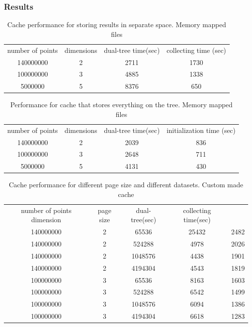 \documentclass[12pt,letterpaper,doublespaced,ETD,dvips,proposal]{gtthesis}
\begin{document}
\begin{Body}
\subsubsection{Results}
\begin{table}[!htb]
\footnotesize{ \centering
\begin{tabular}{|c|c|c|c|}
  \hline
  number of points & dimensions & dual-tree time(sec)& collecting time (sec)\\ 
  140000000        & 2          & 2711               & 1730\\
  100000000        & 3          & 4885               & 1338\\
  5000000          & 5          & 8376               & 650\\
  \hline
\end{tabular}
\caption{Cache performance for storing results in separate space. Memory mapped files}
}
\end{table}

\begin{table}[!htb]
\footnotesize{ \centering
\begin{tabular}{|c|c|c|c|}
  \hline
  number of points & dimensions & dual-tree time(sec)& initialization time (sec)\\ 
  140000000 & 2 & 2039 & 836\\
  100000000 & 3 & 2648 & 711\\
  5000000   & 5 & 4131 & 430\\
  \hline
\end{tabular}
\caption{Performance for cache that stores everything on the tree. Memory mapped files}
}
\end{table}

\begin{table}[!htb]
\footnotesize{ \centering
\begin{tabular}{|c|c|c|c|c|}
  \hline
   number of points dimension & page size & dual-tree(sec) &collecting time(sec) \\
   140000000 & 2 & 65536   & 25432 & 2482 \\
   140000000 & 2 & 524288  & 4978  & 2026 \\
   140000000 & 2 & 1048576 & 4438  & 1901 \\
   140000000 & 2 & 4194304 & 4543  & 1819 \\ 
   100000000 & 3 & 65536   & 8163  & 1603 \\
   100000000 & 3 & 524288  & 6542  & 1499 \\
   100000000 & 3 & 1048576 & 6094  & 1386 \\
   100000000 & 3 & 4194304 & 6618  & 1283 \\
 \hline
\end{tabular}
\caption{Cache performance for different page size and different datasets. Custom made cache}
}
\end{table}



\end{Body}
\end{document}
